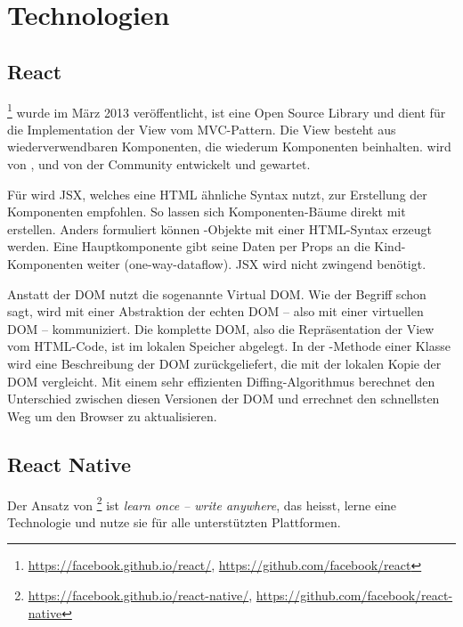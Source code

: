 \chapter{Technologien}
\label{pd-technologien}

\section{React} 
\footnote{\url{https://facebook.github.io/react/}, \url{https://github.com/facebook/react}} wurde im März 2013 veröffentlicht\cite{react-release-date}, ist eine Open Source  \gls{Library} und dient für die Implementation der View vom \gls{MVC}-Pattern. 
Die View besteht aus wiederverwendbaren Komponenten, die wiederum Komponenten beinhalten.
 wird von ,  und von der Community entwickelt und gewartet.\cite{react}

Für  wird \gls{JSX}, welches eine HTML ähnliche Syntax nutzt, zur Erstellung der Komponenten empfohlen. 
So lassen sich Komponenten-Bäume direkt mit  erstellen. 
Anders formuliert können -Objekte mit einer HTML-Syntax erzeugt werden. 
Eine Hauptkomponente gibt seine Daten per Props an die Kind-Komponenten weiter (one-way-dataflow).\cite{react-data-flow} 
\gls{JSX} wird nicht zwingend benötigt.\cite{jsx-syntax} 

Anstatt der \gls{DOM} nutzt  die sogenannte \gls{Virtual DOM}.
Wie der Begriff schon sagt, wird mit einer Abstraktion der echten \gls{DOM} -- also mit einer virtuellen DOM -- kommuniziert.
Die komplette \gls{DOM}, also die Repräsentation der View vom HTML-Code, ist im lokalen Speicher abgelegt.\cite{virtual-dom}
In der -Methode einer Klasse wird eine Beschreibung der DOM zurückgeliefert, die  mit der lokalen Kopie der \gls{DOM} vergleicht.
Mit einem sehr effizienten Diffing-Algorithmus berechnet  den Unterschied zwischen diesen  Versionen der \gls{DOM} und errechnet den schnellsten Weg um den Browser zu aktualisieren.\cite{react-virtual-dom}

\section{React Native}
Der Ansatz von \footnote{\url{https://facebook.github.io/react-native/}, \url{https://github.com/facebook/react-native}} ist \textit{learn once -- write anywhere}, das heisst, lerne eine Technologie und nutze sie für alle unterstützten Plattformen.\cite{react-native}

